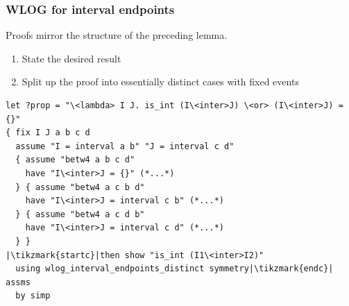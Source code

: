 \documentclass[12pt,notheorems,aspectratio=169,notes,handout]{beamer}
\begin{document}
\begin{frame}[fragile]\frametitle{WLOG for interval endpoints}
	Proofs mirror the structure of the preceding lemma.
	\begin{enumerate}
	\item<2> State the desired result
	\item<3> Split up the proof into essentially distinct cases with fixed events
	\end{enumerate}
		{\lstset{escapeinside=||}
\begin{lstlisting}
let ?prop = "\<lambda> I J. is_int (I\<inter>J) \<or> (I\<inter>J) = {}"
{ fix I J a b c d
  assume "I = interval a b" "J = interval c d"
  { assume "betw4 a b c d"
    have "I\<inter>J = {}" (*...*)
  } { assume "betw4 a c b d"
    have "I\<inter>J = interval c b" (*...*)
  } { assume "betw4 a c d b"
    have "I\<inter>J = interval c d" (*...*)
  } }
|\tikzmark{startc}|then show "is_int (I1\<inter>I2)"
  using wlog_interval_endpoints_distinct symmetry|\tikzmark{endc}| assms
  by simp
\end{lstlisting}}

\end{frame}
\end{document}
